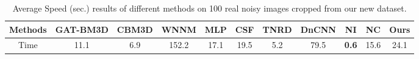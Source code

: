 \begin{table}\vspace{-4mm}
\small
\caption{Average Speed (sec.) results of different methods on 100 real noisy images cropped from our new dataset.}
\vspace{-4mm}
\label{tab5}
\begin{center}
\renewcommand\arraystretch{1}
\begin{tabular}{|c||c|c|c|c|c|c|c|c|c|c|}
\hline
Methods
&\textbf{GAT-BM3D}
&\textbf{CBM3D}
&\textbf{WNNM}
&\textbf{MLP}
&\textbf{CSF} 
&\textbf{TNRD} 
&\textbf{DnCNN}
&\textbf{NI} 
&\textbf{NC} 
&\textbf{Ours} 
\\
\hline
Time  
& 11.1 & 6.9 & 152.2 & 17.1 & 19.5 & 5.2 & 79.5 & \textbf{0.6} & 15.6 & 24.1
\\
\hline
\end{tabular}
\end{center}
\end{table}


